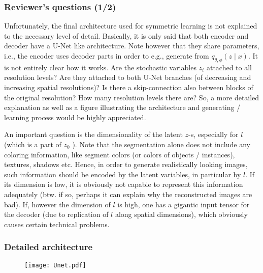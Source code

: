 \documentclass[aspectratio=169]{beamer}
\begin{document}
\begin{frame}
    \frametitle{Reviewer's questions (1/2)}
    {\small
    Unfortunately, the final architecture used for symmetric learning is not explained to the necessary level of detail.
Basically, it is only said that both encoder and decoder have a U-Net like architecture. Note however that they
share parameters, i.e., the encoder uses decoder parts in order to e.g., generate from $q_{\theta,\phi}(z \mid x)$. 
It is not entirely clear how it works. Are the stochastic variables $z_i$ attached to all resolution levels? Are they 
attached to both U-Net branches (of decreasing and increasing spatial resolutions)? Is there a skip-connection also 
between blocks of the original resolution? How many resolution levels there are? So, a more detailed explanation as 
well as a figure illustrating the architecture and generating / learning process would be highly appreciated.

An important question is the dimensionality of the latent $z$-s, especially for $l$ (which is a part of $z_0$ ). Note that the
segmentation alone does not include any coloring information, like segment colors (or colors of objects /
instances), textures, shadows etc. Hence, in order to generate realistically looking images, such information
should be encoded by the latent variables, in particular by $l$. If its dimension is low, it is obviously not capable to
represent this information adequately (btw. if so, perhaps it can explain why the reconstructed images are bad).
If, however the dimension of $l$ is high, one has a gigantic input tensor for the decoder (due to replication of $l$
along spatial dimensions), which obviously causes certain technical problems.}
\end{frame}

\begin{frame}
    \frametitle{Detailed architecture}
    \begin{figure}[t]
        \centering
        \texttt{[image: Unet.pdf]}
    \end{figure}
\end{frame}
    
\end{document}
